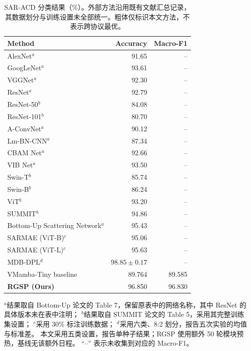 \documentclass[journal]{IEEEtran}
\begin{document}
\begin{table}[!t]
\centering
\small
\setlength{\tabcolsep}{5pt}
\caption{SAR-ACD 分类结果（\%）。外部方法沿用既有文献汇总记录，其数据划分与训练设置未全部统一。粗体仅标识本文方法，不表示跨协议最优。}
\label{tab:sar_acd_comparison}
\begin{tabular}{lrr}
\toprule
Method & Accuracy & Macro-F1 \\
\midrule
AlexNet$^{a}$       & 91.65 & -- \\
GoogLeNet$^{a}$     & 93.61 & -- \\
VGGNet$^{a}$        & 92.30 & -- \\
ResNet$^{a}$        & 92.79 & -- \\
ResNet-50$^{b}$     & 84.08 & -- \\
ResNet-101$^{b}$    & 80.70 & -- \\
A-ConvNet$^{a}$     & 90.12 & -- \\
Lm-BN-CNN$^{a}$     & 87.34 & -- \\
CBAM Net$^{a}$     & 92.66 & -- \\
VIB Net$^{a}$      & 93.50 & -- \\
Swin-T$^{b}$        & 85.74 & -- \\
Swin-B$^{b}$        & 86.24 & -- \\
ViT$^{b}$           & 93.20 & -- \\
SUMMIT$^{b}$        & 94.86 & -- \\
Bottom-Up Scattering Network$^{a}$
                   & 95.43 & -- \\
SARMAE (ViT-B)$^{c}$ & 95.06 & -- \\
SARMAE (ViT-L)$^{c}$ & 95.63 & -- \\
MDB-DPL$^{d}$      & $98.85\pm0.17$ & -- \\
\midrule
VMamba-Tiny baseline & 89.764 & 89.585 \\
\textbf{RGSP (Ours)}  & 96.850 & 96.830 \\
\bottomrule
\end{tabular}
\smallskip
\begin{minipage}{0.98\linewidth}
\footnotesize
$^{a}$结果取自 Bottom-Up 论文的 Table 7，保留原表中的网络名称，其中 ResNet 的具体版本未在表中注明；
$^{b}$结果取自 SUMMIT 论文的 Table 5，采用其完整训练集设置；
$^{c}$采用 30\% 标注训练数据；
$^{d}$采用六类、8:2 划分，报告五次实验的均值与标准差。
本文采用五类设置，报告单种子结果；RGSP 使用额外 50 轮模块预热，基线无该额外日程。
``--'' 表示未收集到对应的 Macro-F1。
\end{minipage}
\end{table}
\end{document}
